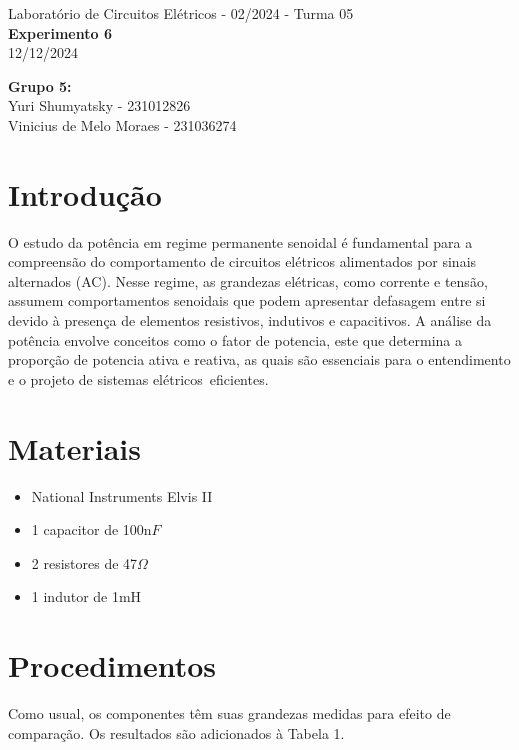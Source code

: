 \documentclass[a4 paper]{article}
\newcommand{\parag}{\hspace{30pt}}
\begin{document}
\justifying
\begin{center}{\large Laboratório de Circuitos Elétricos - 02/2024 - Turma 05}\\
{\large \textbf{Experimento 6}}\\ 
12/12/2024
\end{center}

\vspace{500pt}
 \noindent\textbf{Grupo 5:}\\
 Yuri Shumyatsky - 231012826\\
Vinicius de Melo Moraes - 231036274\\



\vspace{30pt}
\newpage

\section{Introdução}
\parag O estudo da potência em regime permanente senoidal é fundamental para a compreensão do comportamento de circuitos elétricos alimentados por sinais alternados (AC). Nesse regime, as grandezas elétricas, como corrente e tensão, assumem comportamentos senoidais que podem apresentar defasagem entre si devido à presença de elementos resistivos, indutivos e capacitivos. A análise da potência envolve conceitos como o fator de potencia, este que determina a proporção de potencia ativa e reativa, as quais são essenciais para o entendimento e o projeto de sistemas elétricos eficientes.



\vspace{5cm}
\section{Materiais}


	\begin{itemize}
	\item National Instruments Elvis II
	\item 1 capacitor de 100n$F$
	\item 2 resistores de 47$\Omega$
	\item 1 indutor de 1mH
	\end{itemize}

\newpage

\section{Procedimentos}
\parag Como usual, os componentes têm suas grandezas medidas para efeito de comparação. Os resultados são adicionados à Tabela 1.
\end{document}
